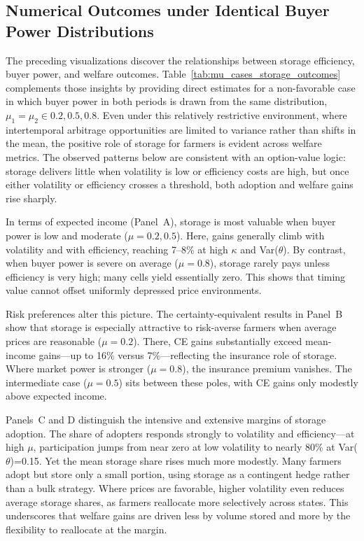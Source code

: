 \subsection{Numerical Outcomes under Identical Buyer Power Distributions}
\noindent The preceding visualizations discover the relationships between storage efficiency, buyer power, and welfare outcomes. Table~\ref{tab:mu_cases_storage_outcomes} complements those insights by providing direct estimates for a non-favorable case in which buyer power in both periods is drawn from the same distribution, $\mu_1=\mu_2 \in {0.2,0.5,0.8}$. Even under this relatively restrictive environment, where intertemporal arbitrage opportunities are limited to variance rather than shifts in the mean, the positive role of storage for farmers is evident across welfare metrics. The observed patterns below are consistent with an option-value logic: storage delivers little when volatility is low or efficiency costs are high, but once either volatility or efficiency crosses a threshold, both adoption and welfare gains rise sharply.

In terms of expected income (Panel~A), storage is most valuable when buyer power is low and moderate ($\mu=0.2,0.5$). Here, gains generally climb with volatility and with efficiency, reaching 7--8\% at high $\kappa$ and Var($\theta$). By contrast, when buyer power is severe on average ($\mu=0.8$), storage rarely pays unless efficiency is very high; many cells yield essentially zero. This shows that timing value cannot offset uniformly depressed price environments.

Risk preferences alter this picture. The certainty-equivalent results in Panel~B show that storage is especially attractive to risk-averse farmers when average prices are reasonable ($\mu=0.2$). There, CE gains substantially exceed mean-income gains---up to 16\% versus 7\%---reflecting the insurance role of storage. Where market power is stronger ($\mu=0.8$), the insurance premium vanishes. The intermediate case ($\mu=0.5$) sits between these poles, with CE gains only modestly above expected income.

Panels~C and D distinguish the intensive and extensive margins of storage adoption. The share of adopters responds strongly to volatility and efficiency---at high $\mu$, participation jumps from near zero at low volatility to nearly 80\% at Var($\theta$)=0.15. Yet the mean storage share rises much more modestly. Many farmers adopt but store only a small portion, using storage as a contingent hedge rather than a bulk strategy. Where prices are favorable, higher volatility even reduces average storage shares, as farmers reallocate more selectively across states. This underscores that welfare gains are driven less by volume stored and more by the flexibility to reallocate at the margin.

